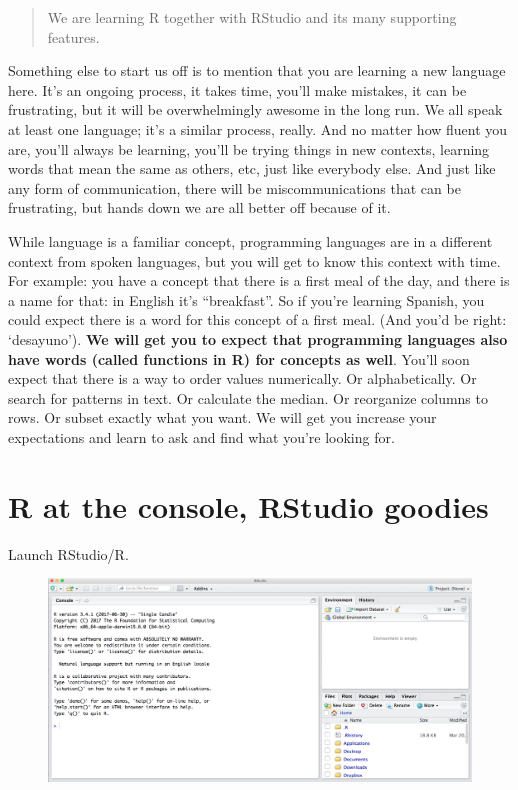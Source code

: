 \documentclass[]{book}
\theoremstyle{definition}
\theoremstyle{definition}
\theoremstyle{definition}
\theoremstyle{remark}
\begin{document}
\begin{quote}
We are learning R together with RStudio and its many supporting
features.
\end{quote}

Something else to start us off is to mention that you are learning a new
language here. It's an ongoing process, it takes time, you'll make
mistakes, it can be frustrating, but it will be overwhelmingly awesome
in the long run. We all speak at least one language; it's a similar
process, really. And no matter how fluent you are, you'll always be
learning, you'll be trying things in new contexts, learning words that
mean the same as others, etc, just like everybody else. And just like
any form of communication, there will be miscommunications that can be
frustrating, but hands down we are all better off because of it.

While language is a familiar concept, programming languages are in a
different context from spoken languages, but you will get to know this
context with time. For example: you have a concept that there is a first
meal of the day, and there is a name for that: in English it's
``breakfast''. So if you're learning Spanish, you could expect there is
a word for this concept of a first meal. (And you'd be right:
`desayuno'). \textbf{We will get you to expect that programming
languages also have words (called functions in R) for concepts as well}.
You'll soon expect that there is a way to order values numerically. Or
alphabetically. Or search for patterns in text. Or calculate the median.
Or reorganize columns to rows. Or subset exactly what you want. We will
get you increase your expectations and learn to ask and find what you're
looking for.

\section{R at the console, RStudio
goodies}\label{r-at-the-console-rstudio-goodies}

Launch RStudio/R.

\begin{figure}[htbp]
\centering
\includegraphics{img/RStudio_IDE.png}
\caption{}
\end{figure}
\end{document}

